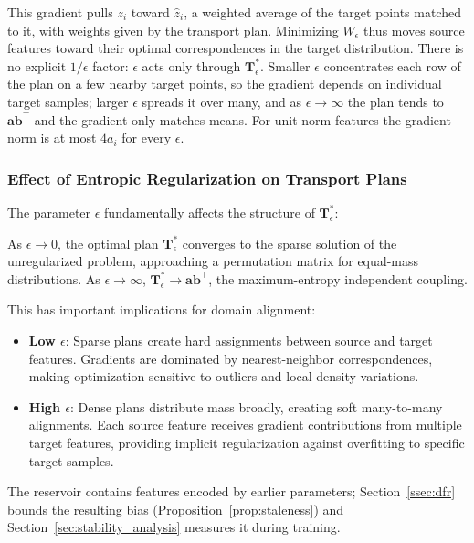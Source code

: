 This gradient pulls $z_i$ toward $\hat z_i$, a weighted average of the target points matched to it, with weights given by the transport plan. Minimizing $W_\epsilon$ thus moves source features toward their optimal correspondences in the target distribution. There is no explicit $1/\epsilon$ factor: $\epsilon$ acts only through $\mathbf T^*_\epsilon$. Smaller $\epsilon$ concentrates each row of the plan on a few nearby target points, so the gradient depends on individual target samples; larger $\epsilon$ spreads it over many, and as $\epsilon\to\infty$ the plan tends to $\mathbf a\mathbf b^\top$ and the gradient only matches means. For unit-norm features the gradient norm is at most $4a_i$ for every $\epsilon$.

\subsubsection{Effect of Entropic Regularization on Transport Plans}

The parameter $\epsilon$ fundamentally affects the structure of $\mathbf{T}^*_\epsilon$:

\begin{proposition}
\label{prop:entropy}
As $\epsilon \to 0$, the optimal plan $\mathbf{T}^*_\epsilon$ converges to the sparse solution of the unregularized problem, approaching a permutation matrix for equal-mass distributions. As $\epsilon \to \infty$, $\mathbf{T}^*_\epsilon \to \mathbf{a}\mathbf{b}^\top$, the maximum-entropy independent coupling.
\end{proposition}

This has important implications for domain alignment:
\begin{itemize}
    \item \textbf{Low $\epsilon$}: Sparse plans create hard assignments between source and target features. Gradients are dominated by nearest-neighbor correspondences, making optimization sensitive to outliers and local density variations.
    \item \textbf{High $\epsilon$}: Dense plans distribute mass broadly, creating soft many-to-many alignments. Each source feature receives gradient contributions from multiple target features, providing implicit regularization against overfitting to specific target samples.
\end{itemize}

The reservoir contains features encoded by earlier parameters; Section~\ref{ssec:dfr} bounds the resulting bias (Proposition~\ref{prop:staleness}) and Section~\ref{sec:stability_analysis} measures it during training.

